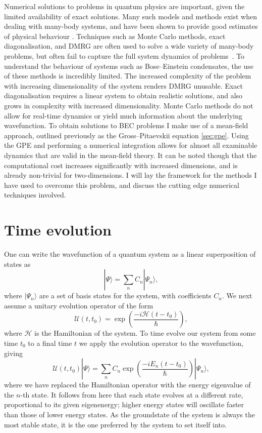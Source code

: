 Numerical solutions to problems in quantum physics are important, given the limited availability of exact solutions. Many such models and methods exist when dealing with many-body systems, and have been shown to provide good estimates of physical behaviour \cite{}. Techniques such as Monte Carlo methods, exact diagonalisation, and DMRG are often used to solve a wide variety of many-body problems, but often fail to capture the full system dynamics of problems~\cite{}. To understand the behaviour of systems such as Bose--Einstein condensates, the use of these methods is incredibly limited. The increased complexity of the problem with increasing dimensionality of the system renders DMRG unusable. Exact diagonalisation requires a linear system to obtain realistic solutions, and also grows in complexity with increased dimensionality. Monte Carlo methods do not allow for real-time dynamics or yield much information about the underlying wavefunction. To obtain solutions to BEC problems I make use of a mean-field approach, outlined previously as the Gross--Pitaevskii equation \ref{sec:gpe}. Using the GPE and performing a numerical integration allows for almost all examinable dynamics that are valid in the mean-field theory. It can be noted though that the computational cost increases significantly with increased dimensions, and is already non-trivial for two-dimensions. I will lay the framework for the methods I have used to overcome this problem, and discuss the cutting edge numerical techniques involved.


\section{Time evolution}
One can write the wavefunction of a quantum system as a linear superposition of states as
\begin{equation}
    |\Psi \rangle = \displaystyle\sum\limits_{n} C_n |\Psi_n \rangle,
\end{equation}
where $| \Psi_n \rangle$ are a set of basis states for the system, with coefficients $C_n$. We next assume a unitary evolution operator of the form
\begin{equation}
   \mathscr{U}(t,t_0) = \exp\left(\frac{-i\mathcal{H}(t-t_0)}{\hbar}\right),
\end{equation}
where $\mathcal{H}$ is the Hamiltonian of the system. To time evolve our system from some time $t_0$ to a final time $t$ we apply the evolution operator to the wavefunction, giving
\begin{equation}
   \mathscr{U}(t,t_0)|\Psi \rangle = \displaystyle\sum\limits_{n} C_n \exp\left(\frac{-i{E_n}(t-t_0)}{\hbar}\right)|\Psi_n \rangle,
\end{equation}
where we have replaced the Hamiltonian operator with the energy eigenvalue of the $n$-th state. It follows from here that each state evolves at a different rate, proportional to its given eigenenergy; higher energy states will oscillate faster than those of lower energy states. As the groundstate of the system is always the most stable state, it is the one preferred by the system to set itself into.

